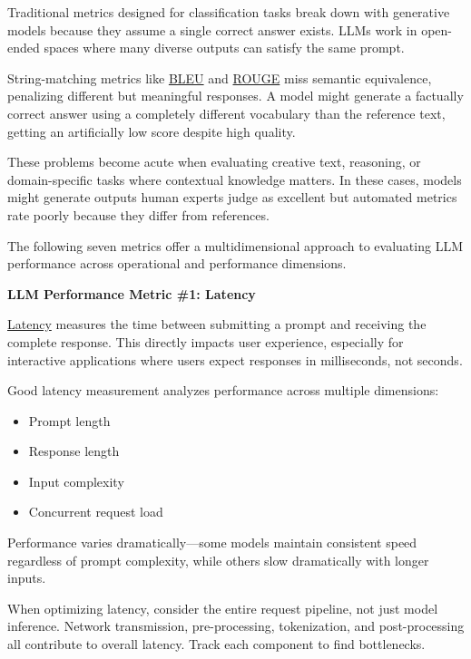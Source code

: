 \documentclass[
  letterpaper,
  DIV=11,
  numbers=noendperiod,
  oneside]{scrreprt}
\begin{document}
\begin{tcolorbox}
Traditional metrics designed for classification tasks break down with
generative models because they assume a single correct answer exists.
LLMs work in open-ended spaces where many diverse outputs can satisfy
the same prompt.

String-matching metrics like
\href{https://www.galileo.ai/blog/bleu-metric-ai-evaluation}{BLEU} and
\href{https://www.galileo.ai/blog/rouge-ai}{ROUGE} miss semantic
equivalence, penalizing different but meaningful responses. A model
might generate a factually correct answer using a completely different
vocabulary than the reference text, getting an artificially low score
despite high quality.

These problems become acute when evaluating creative text, reasoning, or
domain-specific tasks where contextual knowledge matters. In these
cases, models might generate outputs human experts judge as excellent
but automated metrics rate poorly because they differ from references.

The following seven metrics offer a multidimensional approach to
evaluating LLM performance across operational and performance
dimensions.

\textbf{LLM Performance Metric \#1: Latency}

\href{https://www.galileo.ai/blog/understanding-latency-in-ai-what-it-is-and-how-it-works}{Latency}
measures the time between submitting a prompt and receiving the complete
response. This directly impacts user experience, especially for
interactive applications where users expect responses in milliseconds,
not seconds.

Good latency measurement analyzes performance across multiple
dimensions:

\begin{itemize}
\item
  Prompt length
\item
  Response length
\item
  Input complexity
\item
  Concurrent request load
\end{itemize}

Performance varies dramatically---some models maintain consistent speed
regardless of prompt complexity, while others slow dramatically with
longer inputs.

When optimizing latency, consider the entire request pipeline, not just
model inference. Network transmission, pre-processing, tokenization, and
post-processing all contribute to overall latency. Track each component
to find bottlenecks.


\end{tcolorbox}
\end{document}
